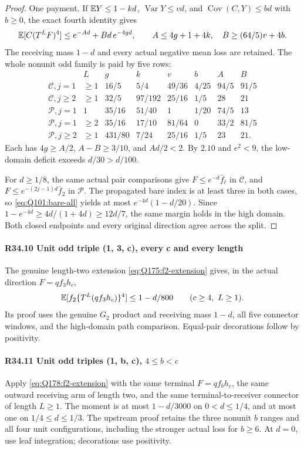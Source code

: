 \begin{proof}
One payment. If \(\mathbb E Y\le1-kd\),
\(\operatorname{Var}Y\le vd\), and
\(\operatorname{Cov}(C,Y)\le bd\) with \(b\ge0\), the exact
fourth identity gives
\[
 \mathbb E[C(T^LF)^4]\le e^{-Ad}+Bd\,e^{-4gd},\qquad
 A\le4g+1+4k,\quad B\ge(64/5)v+4b.
\]
The receiving mass \(1-d\) and every actual negative mean loss
are retained. The whole nonunit odd family is paid by five rows:
\[
\begin{array}{c|c|c|c|c|c|c|c}
 &L&g&k&v&b&A&B\\\hline
\mathcal C,j=1&\ge1&16/5&5/4&49/36&4/25&94/5&91/5\\
\mathcal C,j\ge2&\ge1&32/5&97/192&25/16&1/5&28&21\\
\mathcal P,j=1&1&35/16&51/40&1&1/20&74/5&13\\
\mathcal P,j=1&\ge2&35/16&17/10&81/64&0&33/2&81/5\\
\mathcal P,j\ge2&\ge1&431/80&7/24&25/16&1/5&23&21.
\end{array}
\]
Each has \(4g\ge A/2\), \(A-B\ge3/10\), and \(Ad/2<2\).
By \(2.10\) and \(e^2<9\), the low-domain deficit exceeds
\(d/30>d/100\).

For \(d\ge1/8\), the same actual pair comparisons give
\(F\le e^{-d}\bar f_\ell\) in \(\mathcal C\), and
\(F\le e^{-(2j-1)d}\bar f_2\) in \(\mathcal P\).
The propagated bare index is at least three in both cases, so
\eqref{eq:Q101:bare-all} yields at most \(e^{-4d}(1-d/20)\).
Since \(1-e^{-4d}\ge4d/(1+4d)\ge12d/7\), the same margin
holds in the high domain. Both closed endpoints and every original
direction agree across the split.
\end{proof}

\paragraph{R34.10 Unit odd triple (1, 3, c), every c and every length}
The genuine length-two extension \eqref{eq:Q175:f2-extension}
gives, in the actual direction \(F=qf_3h_c\),
\[
 \mathbb E[f_2\{T^L(qf_3h_c)\}^4]\le1-d/800
 \qquad(c\ge4,\ L\ge1).
\]
Its proof uses the genuine \(G_2\) product and receiving mass
\(1-d\), all five connector windows, and the high-domain path
comparison. Equal-pair decorations follow by positivity.

\paragraph{R34.11 Unit odd triples (1, b, c), \(4\le b<c\)}
Apply \eqref{eq:Q178:f2-extension} with the same terminal
\(F=qf_bh_c\), the same outward receiving arm of length two,
and the same terminal-to-receiver connector of length \(L\ge1\).
The moment is at most \(1-d/3000\) on \(0<d\le1/4\), and at
most one on \(1/4\le d\le1/3\). The upstream proof retains
the three nonunit \(b\) ranges and all four unit configurations,
including the stronger actual loss for \(b\ge6\).
At \(d=0\), use leaf integration; decorations use positivity.

